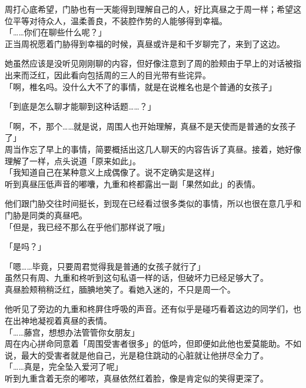 周打心底希望，门胁也有一天能得到理解自己的人，好比真昼之于周一样；希望这位平等对待众人，温柔善良，不装腔作势的人能够得到幸福。\\

「……你们在聊些什么呢？」\\

正当周祝愿着门胁得到幸福的时候，真昼或许是和千岁聊完了，来到了这边。

她虽然应该是没听见刚刚聊的内容，但好像注意到了周的脸颊由于早上的对话被指出来而泛红，因此看向包括周的三人的目光带有些诧异。\\

「啊，椎名吗。没什么大不了的事情，就是在说椎名也是个普通的女孩子」

「到底是怎么聊才能聊到这种话题……？」

「啊，不，那个……就是说，周围人也开始理解，真昼不是天使而是普通的女孩子了」\\

周当作忘了早上的事情，简要概括出这几人聊天的内容告诉了真昼。接着，她好像理解了一样，点头说道「原来如此」。\\

「我知道自己在某种意义上成偶像了。说不定确实是这样」\\

听到真昼压低声音的嘟囔，九重和柊都露出一副「果然如此」的表情。

他们跟门胁交往时间挺长，到现在已经看过很多类似的事情，所以也很在意几乎和门胁是同类的真昼吧。\\

「但是，我已经不那么在乎他们那样说了哦」

「是吗？」

「嗯……毕竟，只要周君觉得我是普通的女孩子就行了」\\

虽然只有周、九重和柊听到这句私语一样的话，但破坏力已经足够大了。\\

真昼脸颊稍稍泛红，腼腆地笑了。看她入迷的，不只是周一个。

他听见了旁边的九重和柊屛住呼吸的声音。还有似乎是碰巧看着这边的同学们，也在出神地凝视着真昼的表情。\\

「……藤宫，想想办法管管你女朋友」\\

周在内心拼命同意着「周围受害者很多」的低吟，但即便如此他也爱莫能助。不如说，最大的受害者就是他自己，光是稳住跳动的心脏就让他拼尽全力了。\\

「……真是，完全坠入爱河了呢」\\

听到九重含着无奈的嘟哝，真昼依然红着脸，像是肯定似的笑得更深了。
